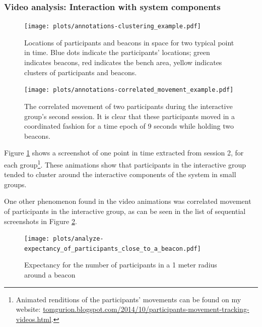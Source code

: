 \documentclass[a4paper,11pt]{article}
\begin{document}
{\subsubsection{Video analysis: Interaction with system components}\label{results:system}

\begin{figure}[!htb]
    \centering
    \texttt{[image: plots/annotations-clustering\_example.pdf]}
    \caption{Locations of participants and beacons in space for two typical point in time. Blue dots indicate the participants' locations; green indicates beacons, red indicates the bench area, yellow indicates clusters of participants and beacons.}\label{plot:annotations-clustering_example}
\end{figure}

\begin{figure}[!htb]
    \centering
    \texttt{[image: plots/annotations-correlated\_movement\_example.pdf]}
    \caption{The correlated movement of two participants during the interactive group's second session. It is clear that these participants moved in a coordinated fashion for a time epoch of 9 seconds while holding two beacons.}\label{plot:annotations-correlated_movement_example}
\end{figure}

Figure \ref{plot:annotations-clustering_example} shows a screenshot of one point in time extracted from session 2, for each group\footnote{Animated renditions of the participants' movements can be found on my website: \href{http://tomgurion.blogspot.com/2014/10/participants-movement-tracking-videos.html}{tomgurion.blogspot.com/2014/10/participants-movement-tracking-videos.html}.}.
These animations show that participants in the interactive group tended to cluster around the interactive components of the system in small groups.

One other phenomenon found in the video animations was correlated movement of participants in the interactive group, as can be seen in the list of sequential screenshots in Figure \ref{plot:annotations-correlated_movement_example}.

\begin{figure}[!htb]
    \centering
    \texttt{[image: plots/analyze-expectancy\_of\_participants\_close\_to\_a\_beacon.pdf]}
    \caption{Expectancy for the number of participants in a 1 meter radius around a beacon}\label{plot:analyze-expectancy_of_participants_close_to_a_beacon}
\end{figure}

}
\end{document}
